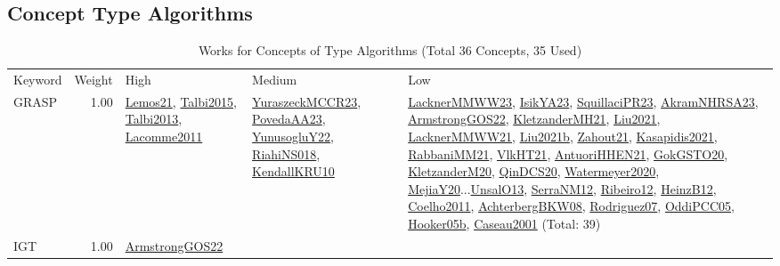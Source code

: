 \clearpage
\subsection{Concept Type Algorithms}
\label{sec:Algorithms}
\label{Algorithms}
{\scriptsize
\begin{longtable}{p{3cm}r>{\raggedright\arraybackslash}p{6cm}>{\raggedright\arraybackslash}p{6cm}>{\raggedright\arraybackslash}p{8cm}}
\rowcolor{white}\caption{Works for Concepts of Type Algorithms (Total 36 Concepts, 35 Used)}\\ \toprule
\rowcolor{white}Keyword & Weight & High & Medium & Low\\ \midrule\endhead
\bottomrule
\endfoot
\index{GRASP}\index{Algorithms!GRASP}GRASP &  1.00 & \hyperref[detail:Lemos21]{Lemos21}, \hyperref[detail:Talbi2015]{Talbi2015}, \hyperref[detail:Talbi2013]{Talbi2013}, \hyperref[detail:Lacomme2011]{Lacomme2011} & \hyperref[detail:YuraszeckMCCR23]{YuraszeckMCCR23}, \hyperref[detail:PovedaAA23]{PovedaAA23}, \hyperref[detail:YunusogluY22]{YunusogluY22}, \hyperref[detail:RiahiNS018]{RiahiNS018}, \hyperref[detail:KendallKRU10]{KendallKRU10} & \hyperref[detail:LacknerMMWW23]{LacknerMMWW23}, \hyperref[detail:IsikYA23]{IsikYA23}, \hyperref[detail:SquillaciPR23]{SquillaciPR23}, \hyperref[detail:AkramNHRSA23]{AkramNHRSA23}, \hyperref[detail:ArmstrongGOS22]{ArmstrongGOS22}, \hyperref[detail:KletzanderMH21]{KletzanderMH21}, \hyperref[detail:Liu2021]{Liu2021}, \hyperref[detail:LacknerMMWW21]{LacknerMMWW21}, \hyperref[detail:Liu2021b]{Liu2021b}, \hyperref[detail:Zahout21]{Zahout21}, \hyperref[detail:Kasapidis2021]{Kasapidis2021}, \hyperref[detail:RabbaniMM21]{RabbaniMM21}, \hyperref[detail:VlkHT21]{VlkHT21}, \hyperref[detail:AntuoriHHEN21]{AntuoriHHEN21}, \hyperref[detail:GokGSTO20]{GokGSTO20}, \hyperref[detail:KletzanderM20]{KletzanderM20}, \hyperref[detail:QinDCS20]{QinDCS20}, \hyperref[detail:Watermeyer2020]{Watermeyer2020}, \hyperref[detail:MejiaY20]{MejiaY20}...\hyperref[detail:UnsalO13]{UnsalO13}, \hyperref[detail:SerraNM12]{SerraNM12}, \hyperref[detail:Ribeiro12]{Ribeiro12}, \hyperref[detail:HeinzB12]{HeinzB12}, \hyperref[detail:Coelho2011]{Coelho2011}, \hyperref[detail:AchterbergBKW08]{AchterbergBKW08}, \hyperref[detail:Rodriguez07]{Rodriguez07}, \hyperref[detail:OddiPCC05]{OddiPCC05}, \hyperref[detail:Hooker05b]{Hooker05b}, \hyperref[detail:Caseau2001]{Caseau2001} (Total: 39)\\
\index{IGT}\index{Algorithms!IGT}IGT &  1.00 & \hyperref[detail:ArmstrongGOS22]{ArmstrongGOS22} &  & \\

\end{longtable}}
